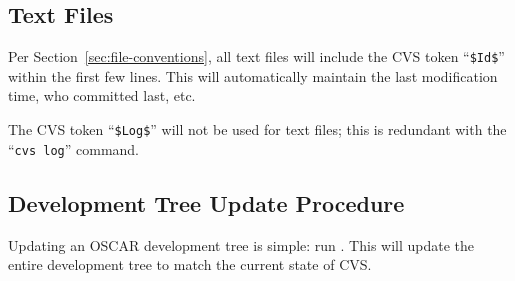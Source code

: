 
\subsection{Text Files}

Per Section~\ref{sec:file-conventions}, all text files will include
the CVS token ``{\tt \$Id\$}'' within the first few lines.  This will
automatically maintain the last modification time, who committed last,
etc.  

The CVS token ``{\tt \$Log\$}'' will not be used for text files; this
is redundant with the ``{\tt cvs log}'' command.


\subsection{Development Tree Update Procedure}

Updating an OSCAR development tree is simple: run .
This will update the entire development tree to match the current
state of CVS.

